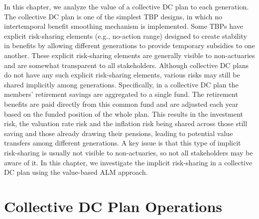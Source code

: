\documentclass{sfuthesis}
\numberwithin{equation}{chapter}
\begin{document}
	\justify
	In this chapter, we analyze the value of a collective DC plan to each generation. The collective DC plan is one of the simplest TBP designs, in which no intertemporal benefit smoothing mechanism is implemented. Some TBPs have explicit risk-sharing elements (e.g., no-action range) designed to create stability in benefits by allowing different generations to provide temporary subsidies to one another. These explicit risk-sharing elements are generally visible to non-actuaries and are somewhat transparent to all stakeholders. Although collective DC plans do not have any such explicit risk-sharing elements, various risks may still be shared implicitly among generations. Specifically, in a collective DC plan the members' retirement savings are aggregated to a single fund. The retirement benefits are paid directly from this common fund and are adjusted each year based on the funded position of the whole plan. This results in the investment risk, the valuation rate risk and the inflation risk being shared across those still saving and those already drawing their pensions, leading to potential value transfers among different generations. A key issue is that this type of implicit risk-sharing is usually not visible to non-actuaries, so not all stakeholders may be aware of it. In this chapter, we investigate the implicit risk-sharing in a collective DC plan using the value-based ALM approach. 
	
	\section{Collective DC Plan Operations}
	\label{CDC Plan Operations}
\end{document}
